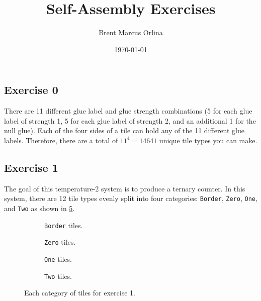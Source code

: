 \documentclass[11pt]{article}
\makeatletter
\renewcommand{\maketitle}{
    {\Large \bf \@title}
    \vspace{0.75em}

    {\normalsize \@author}
    \vspace{0.25em}

    {\normalsize \@date}
    \vspace{1em}
}
\makeatother
\begin{document}
\title{Self-Assembly Exercises}
\date{\today}
\author{Brent Marcus Orlina}
\maketitle

\subsection*{Exercise 0}
There are 11 different glue label and glue strength combinations (5 for each glue label of
strength 1, 5 for each glue label of strength 2, and an additional 1 for the null glue). Each of the
four sides of a tile can hold any of the 11 different glue labels. Therefore, there are a total of
$11^4 = 14641$ unique tile types you can make.

\subsection*{Exercise 1}
The goal of this temperature-2 system is to produce a ternary counter. In this system, there are 12
tile types evenly split into four categories: \verb|Border|, \verb|Zero|, \verb|One|, and \verb|Two|
as shown in \cref{fig:exs-1}.

\begin{figure}[htbp]
    \centering
    \begin{subfigure}{.5\textwidth}
        \centering
        
        
        
        \caption{\texttt{Border} tiles.}
        \label{fig:exs-1_border}
    \end{subfigure}%
    \begin{subfigure}{.5\textwidth}
        \centering
        
        
        
        \caption{\texttt{Zero} tiles.}
        \label{fig:exs-1_zero}
    \end{subfigure}
    \begin{subfigure}{.5\textwidth}
        \centering
        
        
        
        \caption{\texttt{One} tiles.}
        \label{fig:exs-1_one}
    \end{subfigure}%
    \begin{subfigure}{.5\textwidth}
        \centering
        
        
        
        \caption{\texttt{Two} tiles.}
        \label{fig:exs-1_two}
    \end{subfigure}
    \caption{Each category of tiles for exercise 1.}
    \label{fig:exs-1}
\end{figure}
\end{document}
